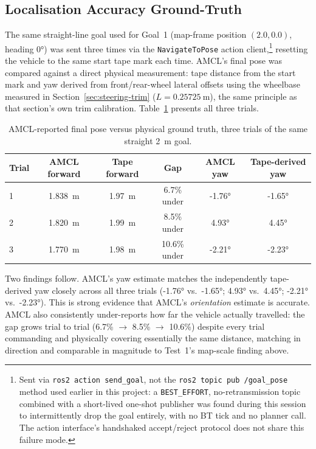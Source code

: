 \subsection{Localisation Accuracy Ground-Truth}
\label{sec:results-localization-accuracy}

The same straight-line goal used for Goal~1 (map-frame position
$(2.0, 0.0)$, heading \ang{0}) was sent three times via the
\texttt{NavigateToPose} action client,\footnote{Sent via
\texttt{ros2 action send\_goal}, not the \texttt{ros2 topic pub
/goal\_pose} method used earlier in this project: a \texttt{BEST\_EFFORT},
no-retransmission topic combined with a short-lived one-shot publisher
was found during this session to intermittently drop the goal
entirely, with no BT tick and no planner call. The action interface's
handshaked accept/reject protocol does not share this failure mode.}
resetting the vehicle to the same start tape mark each time. AMCL's
final pose was compared against a direct physical measurement: tape
distance from the start mark and yaw derived from front/rear-wheel
lateral offsets using the wheelbase measured in
Section~\ref{sec:steering-trim} ($L = \SI{0.25725}{\meter}$), the same
principle as that section's own trim calibration.
Table~\ref{tab:results-localization-accuracy} presents all three
trials.

\begin{table}[htbp]
  \centering
  \caption{AMCL-reported final pose versus physical ground truth, three trials of the same straight \SI{2}{\meter} goal.}
  \label{tab:results-localization-accuracy}
  \begin{tabular}{@{}lccccc@{}}
    \toprule
    Trial & AMCL forward & Tape forward & Gap & AMCL yaw & Tape-derived yaw \\
    \midrule
    1 & \SI{1.838}{\meter} & \SI{1.97}{\meter} & 6.7\% under & \ang{-1.76} & \ang{-1.65} \\
    2 & \SI{1.820}{\meter} & \SI{1.99}{\meter} & 8.5\% under & \ang{4.93} & \ang{4.45} \\
    3 & \SI{1.770}{\meter} & \SI{1.98}{\meter} & 10.6\% under & \ang{-2.21} & \ang{-2.23} \\
    \bottomrule
  \end{tabular}
\end{table}

Two findings follow. AMCL's yaw estimate matches the
independently tape-derived yaw closely across all three trials
(\ang{-1.76} vs.\ \ang{-1.65}; \ang{4.93} vs.\ \ang{4.45}; \ang{-2.21}
vs.\ \ang{-2.23}). This is strong evidence that AMCL's \emph{orientation}
estimate is accurate. AMCL also consistently under-reports how far
the vehicle actually travelled: the gap grows trial to trial
(6.7\% $\to$ 8.5\% $\to$ 10.6\%) despite every trial commanding and
physically covering essentially the same distance, matching in
direction and comparable in magnitude to Test~1's map-scale finding
above.

